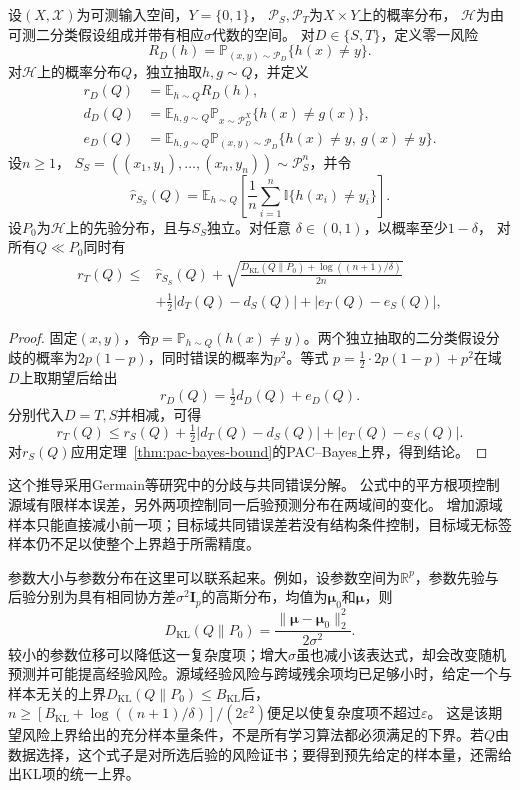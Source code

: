 \begin{theorem}[参数分布的跨域期望风险界]
\label{thm:transfer-pac-bayes}
设$(X,\mathcal X)$为可测输入空间，$Y=\{0,1\}$，
$\mathcal P_S,\mathcal P_T$为$X\times Y$上的概率分布，
$\mathcal H$为由可测二分类假设组成并带有相应$\sigma$代数的空间。
对$D\in\{S,T\}$，定义零一风险
\[
 R_D(h)=\mathbb P_{(x,y)\sim\mathcal P_D}\{h(x)\neq y\}.
\]
对$\mathcal H$上的概率分布$Q$，独立抽取$h,g\sim Q$，并定义
\[
 \begin{aligned}
 r_D(Q)&=\mathbb E_{h\sim Q}R_D(h),\\
 d_D(Q)&=\mathbb E_{h,g\sim Q}
 \mathbb P_{x\sim\mathcal P_D^X}\{h(x)\neq g(x)\},\\
 e_D(Q)&=\mathbb E_{h,g\sim Q}
 \mathbb P_{(x,y)\sim\mathcal P_D}
 \{h(x)\neq y,\ g(x)\neq y\}.
 \end{aligned}
\]
设$n\geq1$，
$S_S=((x_1,y_1),\ldots,(x_n,y_n))\sim\mathcal P_S^n$，并令
\[
 \widehat r_{S_S}(Q)=\mathbb E_{h\sim Q}
 \left[\frac1n\sum_{i=1}^n\mathbb I\{h(x_i)\neq y_i\}\right].
\]
设$P_0$为$\mathcal H$上的先验分布，且与$S_S$独立。对任意
$\delta\in(0,1)$，以概率至少$1-\delta$，
对所有$Q\ll P_0$同时有
\begin{equation}
 \begin{aligned}
 r_T(Q)\leq{}&\widehat r_{S_S}(Q)
 +\sqrt{\frac{D_{\mathrm{KL}}(Q\|P_0)+\log((n+1)/\delta)}{2n}}\\
 &+\tfrac12|d_T(Q)-d_S(Q)|+|e_T(Q)-e_S(Q)|,
 \end{aligned}
 \label{eq:transfer-pac-bayes}
\end{equation}
\end{theorem}
\begin{proof}
固定$(x,y)$，令$p=\mathbb P_{h\sim Q}(h(x)\neq y)$。两个独立抽取的二分类假设分歧的概率为$2p(1-p)$，同时错误的概率为$p^2$。等式
$p=\tfrac12\cdot2p(1-p)+p^2$在域$D$上取期望后给出
\[
 r_D(Q)=\tfrac12d_D(Q)+e_D(Q).
\]
分别代入$D=T,S$并相减，可得
\[
 r_T(Q)\leq r_S(Q)+\tfrac12|d_T(Q)-d_S(Q)|+|e_T(Q)-e_S(Q)|.
\]
对$r_S(Q)$应用定理~\ref{thm:pac-bayes-bound}的PAC--Bayes上界，得到结论。
\end{proof}

这个推导采用Germain等研究中的分歧与共同错误分解。
公式中的平方根项控制源域有限样本误差，另外两项控制同一后验预测分布在两域间的变化。
增加源域样本只能直接减小前一项；目标域共同错误差若没有结构条件控制，目标域无标签
样本仍不足以使整个上界趋于所需精度。

参数大小与参数分布在这里可以联系起来。例如，设参数空间为$\mathbb R^p$，参数先验与后验分别为具有相同协方差$\sigma^2\bm I_p$的高斯分布，均值为$\bm\mu_0$和$\bm\mu$，则
\[
 D_{\mathrm{KL}}(Q\|P_0)=\frac{\|\bm\mu-\bm\mu_0\|_2^2}{2\sigma^2}.
\]
较小的参数位移可以降低这一复杂度项；增大$\sigma$虽也减小该表达式，却会改变随机预测并可能提高经验风险。源域经验风险与跨域残余项均已足够小时，给定一个与样本无关的上界$D_{\mathrm{KL}}(Q\|P_0)\leq B_{\mathrm{KL}}$后，
$n\geq[B_{\mathrm{KL}}+\log((n+1)/\delta)]/(2\varepsilon^2)$便足以使复杂度项不超过$\varepsilon$。
这是该期望风险上界给出的充分样本量条件，不是所有学习算法都必须满足的下界。若$Q$由数据选择，这个式子是对所选后验的风险证书；要得到预先给定的样本量，还需给出KL项的统一上界。

